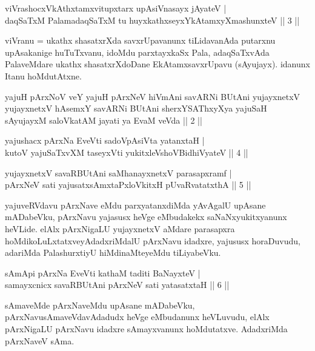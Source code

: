 \vskip 5pt
\begin{shl}
viVrashocxVkAthxtamxvitupxtarx upAsiVnasayx jAyateV | \\
daqSaTxM PalamadaqSaTxM tu huyxkathxseyxYkAtamxyXmashunxteV \hfill ||  3 || 
\end{shl}
\vskip 5pt
\begin{artha}
viVranu = ukathx shasatxrXda savxrUpavanunx tiLidavanAda putarxnu upAsakanige huTuTxvanu, idoMdu parxtayxkaSx Pala, adaqSaTxvAda PalaveMdare ukathx shasatxrXdoDane EkAtamxsavxrUpavu (sAyujayx). idanunx Itanu hoMdutAtxne.
\end{artha}
\vskip 5pt
\begin{kandikeshl}
yajuH pArxNoV veY yajuH pArxNeV hiVmAni savARNi BUtAni yujayxnetxV yujayxnetxV hAsemxY savARNi BUtAni sherxYSAThxyXya yajuSaH sAyujayxM saloVkatAM jayati ya EvaM veVda || 2 ||
\end{kandikeshl}
\vskip 5pt
\vskip 5pt
\begin{shl}
yajushacx pArxNa EveVti sadoVpAsiVta yatanxtaH | \\
kutoV yajuSaTxvXM taseyxVti yukitxleVshoV\s BidhiVyateV \hfill ||  4 || 
\end{shl}
\vskip 5pt
\begin{shl}
yujayxnetxV savaRBUtAni saMhanayxnetxV parasapxramf | \\
pArxNeV sati yajusatxsAmxtaPxloVkitxH pUvaRvatatxthA \hfill ||  5 || 
\end{shl}
\vskip 5pt
\begin{artha}
yajuveRVdavu pArxNave eMdu parxyatanxdiMda yAvAgalU upAsane mADabeVku, pArxNavu yajasusx heVge eMbudakekx saNaNxyukitxyanunx heVLide. elAlx pArxNigaLU yujayxnetxV aMdare parasapxra hoMdikoLuLxtatxveyAdadxriMdalU pArxNavu idadxre, yajususx horaDuvudu, adariMda PalashurxtiyU hiMdinaMteyeMdu tiLiyabeVku.
\end{artha}
\vskip 5pt
\begin{shl}
sAmApi pArxNa EveVti kathaM taditi BaNayxteV | \\
samayxcnicx savaRBUtAni pArxNeV sati yatasatxtaH \hfill ||  6 || 
\end{shl}
\vskip 5pt
\begin{artha}
sAmaveMde pArxNaveMdu upAsane mADabeVku, pArxNavu\break sAmaveVdavAdadudx heVge eMbudanunx heVLuvudu, elAlx pArxNigaLU pArxNavu idadxre sAmayxvanunx hoMdutatxve. AdadxriMda pArxNaveV sAma.
\end{artha}
